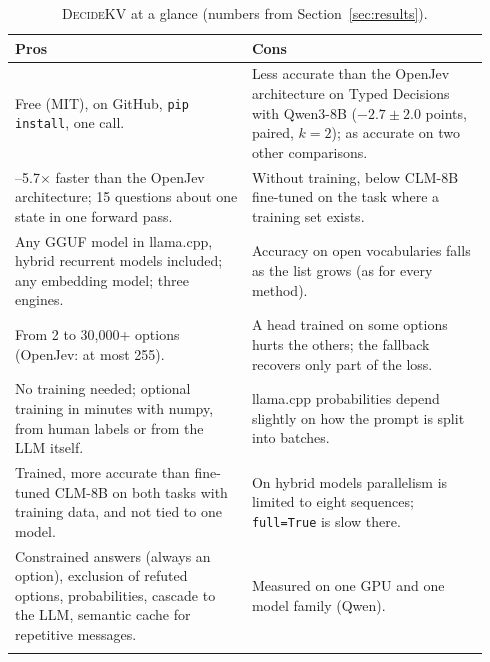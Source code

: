\documentclass[11pt]{article}
\newcommand{\dkv}{\textsc{DecideKV}}
\begin{document}
\begin{table}[t]
\centering\small
\caption{\dkv{} at a glance (numbers from Section~\ref{sec:results}).}\label{tab:proscons}
\begin{tabular}{p{0.47\linewidth}p{0.47\linewidth}}
\toprule
\textbf{Pros} & \textbf{Cons} \\
\midrule
Free (MIT), on GitHub, \texttt{pip install}, one call. &
Less accurate than the OpenJev architecture on Typed Decisions with Qwen3-8B ($-2.7 \pm 2.0$ points, paired,
$k=2$); as accurate on two other comparisons. \\ \addlinespace[3pt]
1.4--5.7$\times$ faster than the OpenJev architecture; 15 questions about one state in one forward pass. &
Without training, below CLM-8B fine-tuned on the task where a training set exists. \\ \addlinespace[3pt]
Any GGUF model in llama.cpp, hybrid recurrent models included; any embedding model; three engines. &
Accuracy on open vocabularies falls as the list grows (as for every method). \\ \addlinespace[3pt]
From 2 to 30{,}000+ options (OpenJev: at most 255). &
A head trained on some options hurts the others; the fallback recovers only part of the loss. \\ \addlinespace[3pt]
No training needed; optional training in minutes with numpy, from human labels or from the LLM itself. &
llama.cpp probabilities depend slightly on how the prompt is split into batches. \\ \addlinespace[3pt]
Trained, more accurate than fine-tuned CLM-8B on both tasks with training data, and not tied to one model. &
On hybrid models parallelism is limited to eight sequences; \texttt{full=True} is slow there. \\ \addlinespace[3pt]
Constrained answers (always an option), exclusion of refuted options, probabilities, cascade to the LLM,
semantic cache for repetitive messages. &
Measured on one GPU and one model family (Qwen). \\ \addlinespace[3pt]
\bottomrule
\end{tabular}
\end{table}
\end{document}
